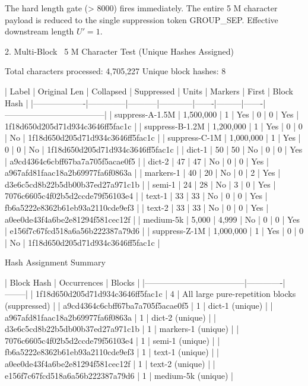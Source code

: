 {{{The hard length gate (> 8000) fires immediately. The entire 5 M character payload is reduced to the single suppression token GROUP_SEP. Effective downstream length \( U' = 1 \).

2. Multi-Block ~5 M Character Test (Unique Hashes Assigned)

Total characters processed: 4,705,227  
Unique block hashes: 8

| Label             | Original Len | Collapsed | Suppressed | Units | Markers | First | Block Hash                         |
|-------------------|--------------|-----------|------------|-------|---------|-------|------------------------------------|
| suppress-A-1.5M   | 1,500,000    | 1         | Yes        | 0     | 0       | Yes   | 1f18d650d205d71d934c3646ff5fac1c |
| suppress-B-1.2M   | 1,200,000    | 1         | Yes        | 0     | 0       | No    | 1f18d650d205d71d934c3646ff5fac1c |
| suppress-C-1M     | 1,000,000    | 1         | Yes        | 0     | 0       | No    | 1f18d650d205d71d934c3646ff5fac1c |
| dict-1            | 50           | 50        | No         | 0     | 0       | Yes   | a9cd4364c6cbff67ba7a705f5acae0f5 |
| dict-2            | 47           | 47        | No         | 0     | 0       | Yes   | a967afd81faac18a2b69977fa6f0863a |
| markers-1         | 40           | 20        | No         | 0     | 2       | Yes   | d3e6c5cd8b22b5db00b37ed27a971c1b |
| semi-1            | 24           | 28        | No         | 3     | 0       | Yes   | 7076c6605c4f02b5d2ccde79f56103e4 |
| text-1            | 33           | 33        | No         | 0     | 0       | Yes   | fb6a5222e8362b61eb93a2110cde9ef3 |
| text-2            | 33           | 33        | No         | 0     | 0       | Yes   | a0ee0de43f4a6be2e81294f581cec12f |
| medium-5k         | 5,000        | 4,999     | No         | 0     | 0       | Yes   | e156f7c67fcd518a6a56b222387a79d6 |
| suppress-Z-1M     | 1,000,000    | 1         | Yes        | 0     | 0       | No    | 1f18d650d205d71d934c3646ff5fac1c |

Hash Assignment Summary

| Block Hash                         | Occurrences | Blocks |
|------------------------------------|-------------|--------|
| 1f18d650d205d71d934c3646ff5fac1c | 4           | All large pure-repetition blocks (suppressed) |
| a9cd4364c6cbff67ba7a705f5acae0f5 | 1           | dict-1 (unique) |
| a967afd81faac18a2b69977fa6f0863a | 1           | dict-2 (unique) |
| d3e6c5cd8b22b5db00b37ed27a971c1b | 1           | markers-1 (unique) |
| 7076c6605c4f02b5d2ccde79f56103e4 | 1           | semi-1 (unique) |
| fb6a5222e8362b61eb93a2110cde9ef3 | 1           | text-1 (unique) |
| a0ee0de43f4a6be2e81294f581cec12f | 1           | text-2 (unique) |
| e156f7c67fcd518a6a56b222387a79d6 | 1           | medium-5k (unique) |

}}}
